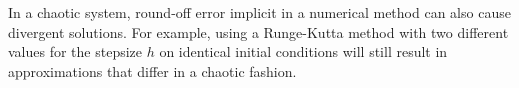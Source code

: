In a chaotic system, round-off error implicit in a numerical method can also cause divergent solutions. For example, using a Runge-Kutta method with two different values for the stepsize $h$ on identical initial conditions will still result in approximations that differ in a chaotic fashion.

\begin{comment}
\begin{figure}
\texttt{[image: figures/perturbed\_lorenz.pdf]}
\caption{Two solutions to the Lorenz equation with perturbed initial conditions}
\label{fig:perturbed_lorenz}
\end{figure}

You may be wondering if your code was even correct.
You could distinctly see the two curves because there was some separation of color, but who is to say that the two solutions moved away from each other only slightly as time went on.
Our next task will be to \textit{animate} this beast.

\section*{Intro to Animation}
Let's get you a degree in Computer Animation.
You will be provided with some code that helps with animation.
Please feel free to play around and try to animate different things.
Again, refer to the \textit{Introduction to Matplotlib} lab for additional help.

We will call on \li{matplotlib.animate} to assist in animation. Import the following:
\begin{lstlisting}
from matplotlib.animation import FuncAnimation
\end{lstlisting}
Follow these steps for setting up an animation.
\begin{itemize}
\item Calculate all data needed for the animation (not necessary in some cases, but it simplifies things).
\item Define a figure explicitly with \li{plt.figure()} and set its window boundaries.
\item Draw empty objects that can be altered dynamically.
\item Define a function to update the drawing objects.
\item make a call to \li{FuncAnimation()} which will start the animation.
\end{itemize}
\li{FuncAnimation()} accepts the figure to be animated, the function that updates the figure, the number of frames to show before repeating, and how fast to run the animation (lower number $=$ faster).


\end{comment}
